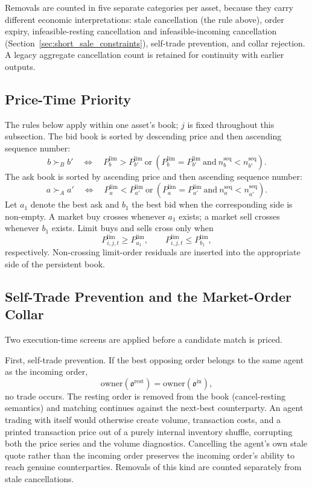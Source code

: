 \documentclass[12pt, a4paper]{article}
\begin{document}
    Removals are counted in five separate categories per asset, because they carry
    different economic interpretations: stale cancellation (the rule above), order
    expiry, infeasible-resting cancellation and infeasible-incoming cancellation
    (Section~\ref{sec:short_sale_constraints}), self-trade prevention, and
    collar rejection. A legacy aggregate cancellation count is retained for
    continuity with earlier outputs.

    \subsection{Price-Time Priority}

    The rules below apply within one asset's book; \(j\) is fixed throughout this
    subsection. The bid book is sorted by descending price and then ascending
    sequence number:
    \[
        b\succ_B b'
        \quad\Longleftrightarrow\quad
        P_b^{\text{lim}}>P_{b'}^{\text{lim}}
        \ \text{or}\
        \left(P_b^{\text{lim}}=P_{b'}^{\text{lim}}
            \ \text{and}\ n_b^{\mathrm{seq}}<n_{b'}^{\mathrm{seq}}\right).
    \]
    The ask book is sorted by ascending price and then ascending sequence number:
    \[
        a\succ_A a'
        \quad\Longleftrightarrow\quad
        P_a^{\text{lim}}<P_{a'}^{\text{lim}}
        \ \text{or}\
        \left(P_a^{\text{lim}}=P_{a'}^{\text{lim}}
            \ \text{and}\ n_a^{\mathrm{seq}}<n_{a'}^{\mathrm{seq}}\right).
    \]
    Let \(a_1\) denote the best ask and \(b_1\) the best bid when the corresponding
    side is non-empty. A market buy crosses whenever \(a_1\) exists; a market sell
    crosses whenever \(b_1\) exists. Limit buys and sells cross only when
    \[
        P_{i,j,t}^{\text{lim}}\ge P_{a_1}^{\text{lim}},
        \qquad
        P_{i,j,t}^{\text{lim}}\le P_{b_1}^{\text{lim}},
    \]
    respectively. Non-crossing limit-order residuals are inserted into the
    appropriate side of the persistent book.

    \subsection{Self-Trade Prevention and the Market-Order Collar}\label{sec:stp_collar}

    Two execution-time screens are applied before a candidate match is priced.

    First, self-trade prevention. If the best opposing order belongs to the same
    agent as the incoming order,
    \[
        \mathrm{owner}(\mathfrak{o}^{\mathrm{rest}})
        =
        \mathrm{owner}(\mathfrak{o}^{\mathrm{in}}),
    \]
    no trade occurs. The resting order is removed from the book
    (cancel-resting semantics) and matching continues against the next-best
    counterparty. An agent trading with itself would otherwise create volume,
    transaction costs, and a printed transaction price out of a purely internal
    inventory shuffle, corrupting both the price series and the volume
    diagnostics. Cancelling the agent's own stale quote rather than the incoming
    order preserves the incoming order's ability to reach genuine counterparties.
    Removals of this kind are counted separately from stale cancellations.
\end{document}
